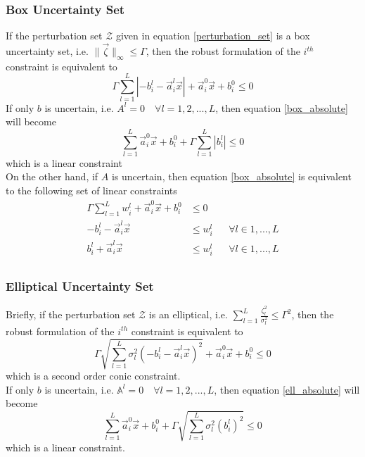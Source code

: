 \subsubsection{Box Uncertainty Set}
If the perturbation set $\mathcal{Z}$ given in equation \eqref{perturbation_set} is a box
uncertainty set, i.e. $\|\vec{\zeta}\|_{\infty} \leq \Gamma$, then the robust formulation of the $i^{th}$ constraint is equivalent to
\begin{equation}
\Gamma \textstyle{\sum}_{l=1}^L |- {b}^l_{i} - \vec{a}^l_i\vec{x}| + \vec{a}^0_i\vec{x} + b^0_i \leq 0
\label{box_absolute}
\end{equation}
If only $b$ is uncertain, i.e. $A^l = 0 \quad \forall l = 1,2,...,L$, then equation \eqref{box_absolute} will become
\begin{equation}
\textstyle{\sum}_{l=1}^L \vec{a}^0_{i}\vec{x} + b^0_{i} + \Gamma \textstyle{\sum}_{l=1}^L |b^l_{i}| \leq 0
\label{box_coeff}
\end{equation}
which is a linear constraint\\
On the other hand, if $A$ is uncertain, then equation \eqref{box_absolute} is equivalent to the following set of linear constraints
\begin{equation}
\begin{aligned}
\Gamma \textstyle{\sum}_{l=1}^L w^l_{i} + \vec{a}^0_{i}\vec{x} + b^0_{i} &\leq 0\\
- b^l_{i} - \vec{a}^l_{i}\vec{x} &\leq w^l_{i} &&\forall l \in 1,...,L\\
b^l_{i} + \vec{a}^l_{i}\vec{x} &\leq w^l_{i} &&\forall l \in 1,...,L\\
\end{aligned}
\label{box_linear}
\end{equation}

\subsubsection{Elliptical Uncertainty Set}
Briefly, if the perturbation set $\mathcal{Z}$ is an elliptical, i.e. $\textstyle{\sum}_{l=1}^L\frac{\zeta_l^2}{\sigma_l^2} \leq \Gamma^2$,
then the robust formulation of the $i^{th}$ constraint is equivalent to
\begin{equation}
\Gamma \sqrt{\textstyle{\sum}_{l=1}^L \sigma_l^2(- b^l_{i} - \vec{a}^l_{i}\vec{x})^2} + \vec{a}^0_{i}\vec{x} + b^0_{i} \leq 0
\label{ell_absolute}
\end{equation}
which is a second order conic constraint.\\
If only $b$ is uncertain, i.e. $\mathbb{A}^l = 0 \quad \forall l = 1,2,...,L$, then equation \eqref{ell_absolute} will become
\begin{equation}
\textstyle{\sum}_{l=1}^L \vec{a}^0_{i}\vec{x} + b^0_{i} + \Gamma \sqrt{\textstyle{\sum}_{l=1}^L \sigma_l^2(b^l_{i})^2} \leq 0
\label{ell_coeff}
\end{equation}
which is a linear constraint.
